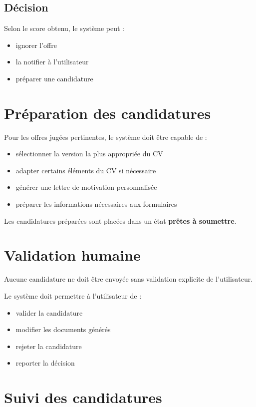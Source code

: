 \documentclass[11pt,a4paper]{article}
\begin{document}
\subsection{Décision}

Selon le score obtenu, le système peut :

\begin{itemize}
\item ignorer l’offre
\item la notifier à l’utilisateur
\item préparer une candidature
\end{itemize}

\section{Préparation des candidatures}

Pour les offres jugées pertinentes, le système doit être capable de :

\begin{itemize}
\item sélectionner la version la plus appropriée du CV
\item adapter certains éléments du CV si nécessaire
\item générer une lettre de motivation personnalisée
\item préparer les informations nécessaires aux formulaires
\end{itemize}

Les candidatures préparées sont placées dans un état \textbf{prêtes à soumettre}.

\section{Validation humaine}

Aucune candidature ne doit être envoyée sans validation explicite de l’utilisateur.

Le système doit permettre à l’utilisateur de :

\begin{itemize}
\item valider la candidature
\item modifier les documents générés
\item rejeter la candidature
\item reporter la décision
\end{itemize}

\section{Suivi des candidatures}
\end{document}
